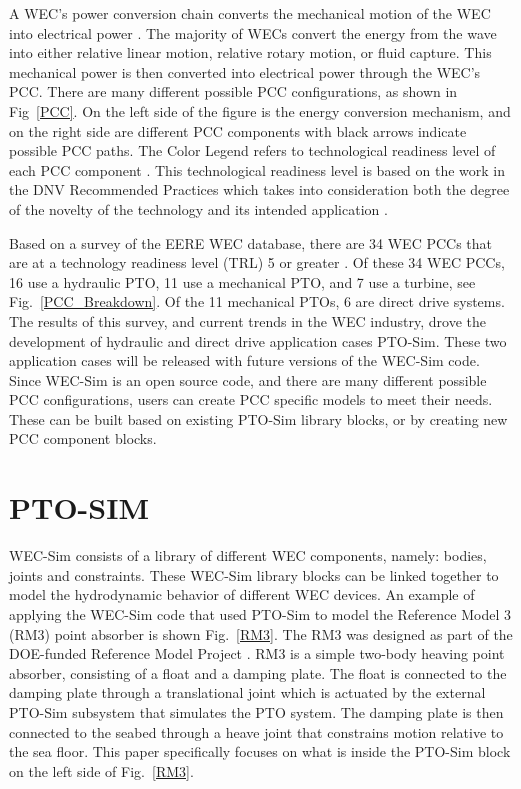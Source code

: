 \documentclass[twocolumn,10pt]{asme2e}
\begin{document}
A WEC's power conversion chain converts the mechanical motion of the WEC into electrical power \cite{yukio2014modeling}. The majority of WECs convert the energy from the wave into either relative linear motion, relative rotary motion, or fluid capture. This mechanical power is then converted into electrical power through the WEC's PCC. There are many different possible PCC configurations, as shown in Fig~\ref{PCC}. On the left side of the figure is the energy conversion mechanism, and on the right side are different PCC components with black arrows indicate possible PCC paths. The Color Legend refers to technological readiness level of each PCC component \cite{reed2010accelerating}\cite{ruehl2012wave}. This technological readiness level is based on the work in the DNV Recommended Practices which takes into consideration both the degree of the novelty of the technology and its intended application \cite{veritas2001recommended}. 

Based on a survey of the EERE WEC database, there are 34 WEC PCCs that are at a technology readiness level (TRL) 5 or greater \cite{eere}. Of these 34 WEC PCCs, 16 use a hydraulic PTO, 11 use a mechanical PTO, and 7 use a turbine, see Fig.~\ref{PCC_Breakdown}. Of the 11 mechanical PTOs, 6 are direct drive systems. The results of this survey, and current trends in the WEC industry, drove the development of hydraulic and direct drive application cases PTO-Sim. These two application cases will be released with future versions of the WEC-Sim code. Since WEC-Sim is an open source code, and there are many different possible PCC configurations, users can create PCC specific models to meet their needs. These can be built based on existing PTO-Sim library blocks, or by creating new PCC component blocks.


\section*{PTO-SIM}

WEC-Sim consists of a library of different WEC components, namely: bodies, joints and constraints. These WEC-Sim library blocks can be linked together to model the hydrodynamic behavior of different WEC devices. An example of applying the WEC-Sim code that used PTO-Sim to model the Reference Model 3 (RM3) point absorber is shown Fig.~\ref{RM3}. The RM3 was designed as part of the DOE-funded Reference Model Project \cite{rmp}. RM3 is a simple two-body heaving point absorber, consisting of a float and a damping plate. The float is connected to the damping plate through a translational joint which is actuated by the external PTO-Sim subsystem that simulates the PTO system. The damping plate is then connected to the seabed through a heave joint that constrains motion relative to the sea floor. This paper specifically focuses on what is inside the PTO-Sim block on the left side of Fig.~\ref{RM3}.
\end{document}
